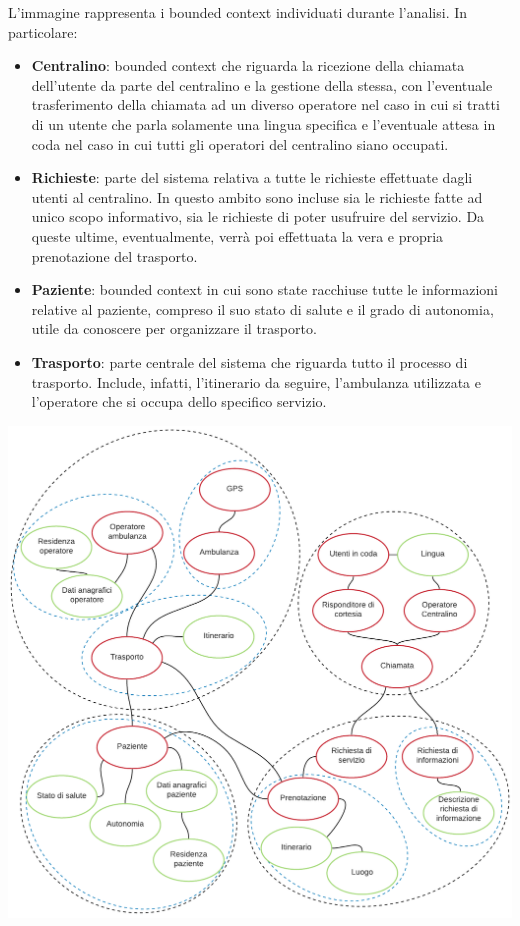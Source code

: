 \documentclass[12pt]{article}
\begin{document}
L'immagine rappresenta i bounded context individuati durante l'analisi.
In particolare:
\begin{itemize}
    \item \textbf{Centralino}: bounded context che riguarda la ricezione della chiamata dell'utente da parte del centralino e la gestione della stessa, con l'eventuale trasferimento della chiamata ad un diverso operatore nel caso in cui si tratti di un utente che parla solamente una lingua specifica e l'eventuale attesa in coda nel caso in cui tutti gli operatori del centralino siano occupati.
    \item \textbf{Richieste}: parte del sistema relativa a tutte le richieste effettuate dagli utenti al centralino. In questo ambito sono incluse sia le richieste fatte ad unico scopo informativo, sia le richieste di poter usufruire del servizio. Da queste ultime, eventualmente, verrà poi effettuata la vera e propria prenotazione del trasporto.
    \item \textbf{Paziente}: bounded context in cui sono state racchiuse tutte le informazioni relative al paziente, compreso il suo stato di salute e il grado di autonomia, utile da conoscere per organizzare il trasporto.
    \item \textbf{Trasporto}: parte centrale del sistema che riguarda tutto il processo di trasporto. Include, infatti, l'itinerario da seguire, l'ambulanza utilizzata e l'operatore che si occupa dello specifico servizio.
\end{itemize}

\centerline{\includegraphics[width=15cm]{fig/BoundedContext.png}}
\end{document}

